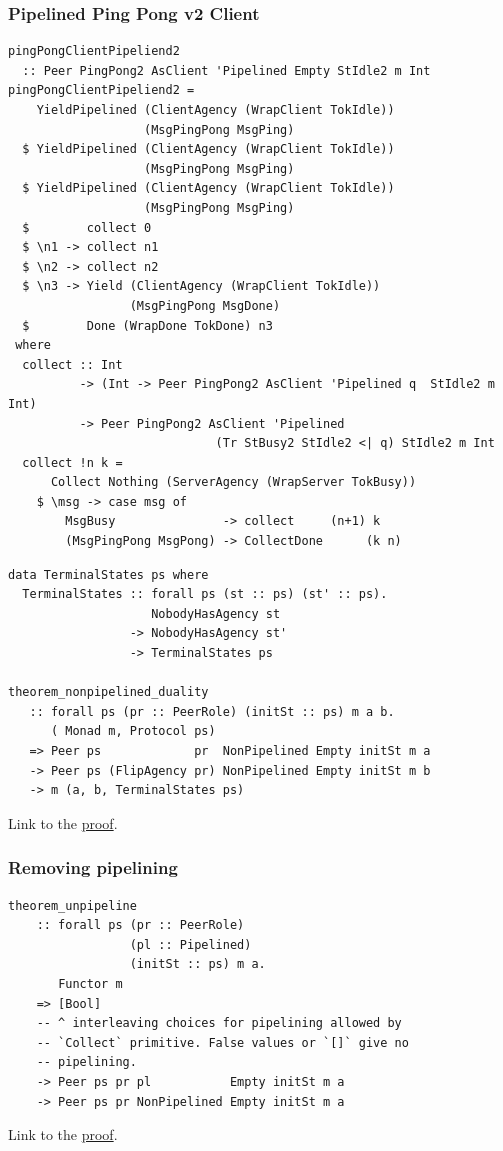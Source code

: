 \documentclass[t,dvipsnames]{beamer}
\begin{document}
\begin{frame}[fragile]
  \frametitle{Pipelined Ping Pong v2 Client}
  \begin{verbatim}
pingPongClientPipeliend2
  :: Peer PingPong2 AsClient 'Pipelined Empty StIdle2 m Int
pingPongClientPipeliend2 =
    YieldPipelined (ClientAgency (WrapClient TokIdle))
                   (MsgPingPong MsgPing)
  $ YieldPipelined (ClientAgency (WrapClient TokIdle))
                   (MsgPingPong MsgPing)
  $ YieldPipelined (ClientAgency (WrapClient TokIdle))
                   (MsgPingPong MsgPing)
  $        collect 0
  $ \n1 -> collect n1
  $ \n2 -> collect n2
  $ \n3 -> Yield (ClientAgency (WrapClient TokIdle))
                 (MsgPingPong MsgDone)
  $        Done (WrapDone TokDone) n3
 where
  collect :: Int
          -> (Int -> Peer PingPong2 AsClient 'Pipelined q  StIdle2 m Int)
          -> Peer PingPong2 AsClient 'Pipelined
                             (Tr StBusy2 StIdle2 <| q) StIdle2 m Int
  collect !n k =
      Collect Nothing (ServerAgency (WrapServer TokBusy))
    $ \msg -> case msg of
        MsgBusy               -> collect     (n+1) k
        (MsgPingPong MsgPong) -> CollectDone      (k n)
  \end{verbatim}
\end{frame}

\begin{frame}[fragile]
  \begin{verbatim}
data TerminalStates ps where
  TerminalStates :: forall ps (st :: ps) (st' :: ps).
                    NobodyHasAgency st
                 -> NobodyHasAgency st'
                 -> TerminalStates ps

theorem_nonpipelined_duality
   :: forall ps (pr :: PeerRole) (initSt :: ps) m a b.
      ( Monad m, Protocol ps)
   => Peer ps             pr  NonPipelined Empty initSt m a
   -> Peer ps (FlipAgency pr) NonPipelined Empty initSt m b
   -> m (a, b, TerminalStates ps)
  \end{verbatim}
  Link to the \href{https://coot.me/posts/typed-protocol-pipelining.html\#duality-for-non-pipelined-protocols}{proof}.
\end{frame}

\begin{frame}[fragile]
  \frametitle{Removing pipelining}
  \begin{verbatim}
theorem_unpipeline
    :: forall ps (pr :: PeerRole)
                 (pl :: Pipelined)
                 (initSt :: ps) m a.
       Functor m
    => [Bool]
    -- ^ interleaving choices for pipelining allowed by
    -- `Collect` primitive. False values or `[]` give no
    -- pipelining.
    -> Peer ps pr pl           Empty initSt m a
    -> Peer ps pr NonPipelined Empty initSt m a
  \end{verbatim}

  Link to the \href{https://coot.me/posts/typed-protocol-pipelining.html\#removing-pipelining}{proof}.
\end{frame}
\end{document}
